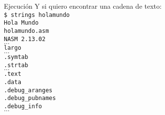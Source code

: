 \documentclass[aspectratio=169]{beamer}
\begin{document}
\begin{frame}[fragile,t]{Ejecución}
    \small
    \textcolor{verdeuca}{Y si quiero encontrar una cadena de texto:}\\
    \pause
    \vspace{0.2cm}
    \verb|$ strings holamundo|\\
    \vspace{0.2cm}
    \pause
    \verb|Hola Mundo|\\
    \verb|holamundo.asm|\\
    \verb|NASM 2.13.02|\\
    \vspace{-0.1cm}
    $\dots$\\
    \vspace{0.1cm}
    \verb|largo|\\
    \vspace{-0.1cm}
    $\dots$\\
    \vspace{0.1cm}
    \verb|.symtab|\\
    \verb|.strtab|\\
    \vspace{-0.1cm}
    $\dots$\\
    \vspace{0.1cm}
    \verb|.text|\\
    \verb|.data|\\
    \verb|.debug_aranges|\\
    \verb|.debug_pubnames|\\
    \verb|.debug_info|\\
    \vspace{-0.1cm}
    $\dots$\\
    \vspace{0.1cm}
\end{frame}
\end{document}
